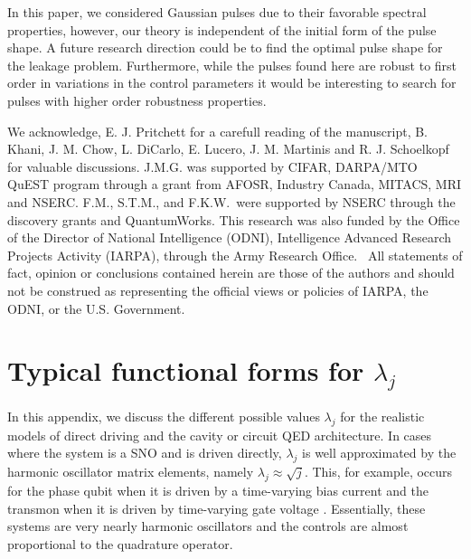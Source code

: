 \documentclass[pra,twocolumn,floatfix,superscriptaddress,eqsecnum]{revtex4-1}
\begin{document}
In this paper, we considered Gaussian pulses due to their favorable spectral properties, however, our theory is independent of the initial form of the pulse shape.  A future research direction could be to find the optimal pulse shape for the leakage problem.  Furthermore, while the pulses found here are robust to first order in variations in the control parameters it would be interesting to search for pulses with higher order robustness properties.


\begin{acknowledgments}
We acknowledge, E. J. Pritchett for a carefull reading of the manuscript, B. Khani, J. M. Chow, L. DiCarlo, E. Lucero, J. M. Martinis and R. J. Schoelkopf for valuable discussions. J.M.G. was supported by CIFAR, DARPA/MTO QuEST program through a grant from AFOSR, Industry Canada, MITACS, MRI and NSERC. F.M., S.T.M., and
F.K.W.~were supported by NSERC through the discovery grants and
QuantumWorks. This research was also funded by the Office of the Director of National
Intelligence (ODNI), Intelligence Advanced Research Projects Activity
(IARPA), through the Army Research Office.  All statements of fact, opinion
or conclusions contained herein are those of the authors and should not be
construed as representing the official views or policies of IARPA, the ODNI,
or the U.S. Government.
\end{acknowledgments}


\appendix

\section{Typical functional forms for $\lambda_j$}\label{sec:lamb}

In this appendix, we discuss the different possible values $\lambda_j$ for the realistic models of direct driving \cite{Martinis2002} and the cavity \cite{Miller2005,Haroche2006} or circuit \cite{Blais2004,Wallraff2004} QED
architecture.
 In cases where the system is a SNO and is driven
directly, $\lambda_j$ is well approximated by the harmonic oscillator matrix elements, namely  $\lambda_j \approx \sqrt{j}$. This, for
example, occurs for the phase qubit when it is driven by a time-varying
bias current \cite{Martinis2002} and the transmon when it is driven by time-varying gate voltage \cite{Leek2009a}. Essentially, these systems are very nearly harmonic oscillators and the controls are almost proportional to the quadrature operator.
\end{document}
